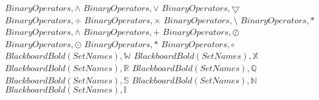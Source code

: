 \documentclass{article}
\begin{document}
$Binary Operators,\land$
\linebreak
\linebreak
$Binary Operators,\vee$
\linebreak
\linebreak
$Binary Operators,\bigtriangledown$
\linebreak
\linebreak
$Binary Operators,\div$
\linebreak
\linebreak
$Binary Operators,\times$
\linebreak
\linebreak
$Binary Operators,\setminus$
\linebreak
\linebreak
$Binary Operators,\ast$
\linebreak
\linebreak
$Binary Operators,\wedge$
\linebreak
\linebreak
$Binary Operators,+$
\linebreak
\linebreak
$Binary Operators,\oslash$
\linebreak
\linebreak
$Binary Operators,\odot$
\linebreak
\linebreak
$Binary Operators,*$
\linebreak
\linebreak
$Binary Operators,\circ$
\linebreak
\linebreak
$Blackboard Bold (Set Names),\mathbb{W}$
\linebreak
\linebreak
$Blackboard Bold (Set Names),\mathbb{X}$
\linebreak
\linebreak
$Blackboard Bold (Set Names),\mathbb{R}$
\linebreak
\linebreak
$Blackboard Bold (Set Names),\mathbb{Q}$
\linebreak
\linebreak
$Blackboard Bold (Set Names),\mathbb{S}$
\linebreak
\linebreak
$Blackboard Bold (Set Names),\mathbb{N}$
\linebreak
\linebreak
$Blackboard Bold (Set Names),\mathbb{I}$
\linebreak
\end{document}
